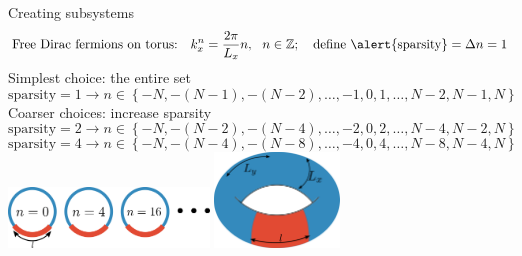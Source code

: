 \documentclass[9pt,aspectratio=169]{beamer}
\begin{document}
\begin{frame}{Creating subsystems}
	\[\text{Free Dirac fermions on torus:}~ ~ ~ k_x^n = \frac{2\pi }{L_x} n,~ ~ n \in \mathbb{Z};~~~ \text{define \alert{sparsity}} = \Delta n = 1\]
	\alert{Simplest} choice: the entire set
	\[\text{sparsity} = 1 \longrightarrow n \in \left\{-N,-(N-1),-(N-2),\ldots,-1,0,1,\ldots,N-2,N-1,N\right\} \]
	\alert{Coarser} choices: increase sparsity
	\[\text{sparsity} = 2 \longrightarrow n \in \left\{-N,-(N-2),-(N-4),\ldots,-2,0,2,\ldots,N-4,N-2,N\right\} \]
	\[\text{sparsity} = 4 \longrightarrow n \in \left\{-N,-(N-4),-(N-8),\ldots,-4,0,4,\ldots,N-8,N-4,N\right\} \]
	\centering
	\vspace*{\fill}
	\includegraphics[width=0.4\textwidth]{figures/A_mi.pdf}
	\hspace*{\fill}
	\includegraphics[width=0.25\textwidth]{figures/subsystem-torus.pdf}
\end{frame}
\end{document}
